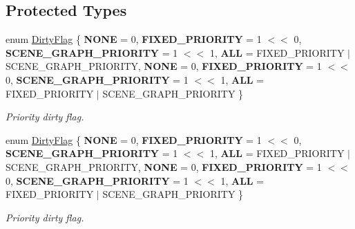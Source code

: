 \subsection*{Protected Types}
\begin{DoxyCompactItemize}
\item 
\mbox{\label{classEventDispatcher_a05d949544dae4e41a1ba912ab962db33}} 
enum \hyperlink{classEventDispatcher_a05d949544dae4e41a1ba912ab962db33}{Dirty\+Flag} \{ \newline
{\bfseries N\+O\+NE} = 0, 
{\bfseries F\+I\+X\+E\+D\+\_\+\+P\+R\+I\+O\+R\+I\+TY} = 1 $<$$<$ 0, 
{\bfseries S\+C\+E\+N\+E\+\_\+\+G\+R\+A\+P\+H\+\_\+\+P\+R\+I\+O\+R\+I\+TY} = 1 $<$$<$ 1, 
{\bfseries A\+LL} = F\+I\+X\+E\+D\+\_\+\+P\+R\+I\+O\+R\+I\+TY $\vert$ S\+C\+E\+N\+E\+\_\+\+G\+R\+A\+P\+H\+\_\+\+P\+R\+I\+O\+R\+I\+TY, 
\newline
{\bfseries N\+O\+NE} = 0, 
{\bfseries F\+I\+X\+E\+D\+\_\+\+P\+R\+I\+O\+R\+I\+TY} = 1 $<$$<$ 0, 
{\bfseries S\+C\+E\+N\+E\+\_\+\+G\+R\+A\+P\+H\+\_\+\+P\+R\+I\+O\+R\+I\+TY} = 1 $<$$<$ 1, 
{\bfseries A\+LL} = F\+I\+X\+E\+D\+\_\+\+P\+R\+I\+O\+R\+I\+TY $\vert$ S\+C\+E\+N\+E\+\_\+\+G\+R\+A\+P\+H\+\_\+\+P\+R\+I\+O\+R\+I\+TY
 \}\begin{DoxyCompactList}\small\item\em Priority dirty flag. \end{DoxyCompactList}
\item 
\mbox{\label{classEventDispatcher_a05d949544dae4e41a1ba912ab962db33}} 
enum \hyperlink{classEventDispatcher_a05d949544dae4e41a1ba912ab962db33}{Dirty\+Flag} \{ \newline
{\bfseries N\+O\+NE} = 0, 
{\bfseries F\+I\+X\+E\+D\+\_\+\+P\+R\+I\+O\+R\+I\+TY} = 1 $<$$<$ 0, 
{\bfseries S\+C\+E\+N\+E\+\_\+\+G\+R\+A\+P\+H\+\_\+\+P\+R\+I\+O\+R\+I\+TY} = 1 $<$$<$ 1, 
{\bfseries A\+LL} = F\+I\+X\+E\+D\+\_\+\+P\+R\+I\+O\+R\+I\+TY $\vert$ S\+C\+E\+N\+E\+\_\+\+G\+R\+A\+P\+H\+\_\+\+P\+R\+I\+O\+R\+I\+TY, 
\newline
{\bfseries N\+O\+NE} = 0, 
{\bfseries F\+I\+X\+E\+D\+\_\+\+P\+R\+I\+O\+R\+I\+TY} = 1 $<$$<$ 0, 
{\bfseries S\+C\+E\+N\+E\+\_\+\+G\+R\+A\+P\+H\+\_\+\+P\+R\+I\+O\+R\+I\+TY} = 1 $<$$<$ 1, 
{\bfseries A\+LL} = F\+I\+X\+E\+D\+\_\+\+P\+R\+I\+O\+R\+I\+TY $\vert$ S\+C\+E\+N\+E\+\_\+\+G\+R\+A\+P\+H\+\_\+\+P\+R\+I\+O\+R\+I\+TY
 \}\begin{DoxyCompactList}\small\item\em Priority dirty flag. \end{DoxyCompactList}
\end{DoxyCompactItemize}
